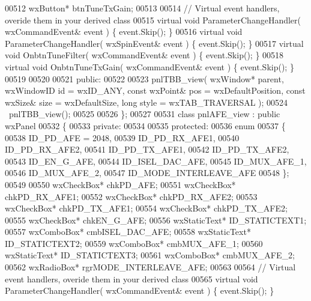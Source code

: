 \begin{DoxyCode}
00512         wxButton* btnTuneTxGain;
00513         
00514         \textcolor{comment}{// Virtual event handlers, overide them in your derived class}
00515         \textcolor{keyword}{virtual} \textcolor{keywordtype}{void} ParameterChangeHandler( wxCommandEvent& event ) \{ \textcolor{keyword}{event}.Skip(); \}
00516         \textcolor{keyword}{virtual} \textcolor{keywordtype}{void} ParameterChangeHandler( wxSpinEvent& event ) \{ \textcolor{keyword}{event}.Skip(); \}
00517         \textcolor{keyword}{virtual} \textcolor{keywordtype}{void} OnbtnTuneFilter( wxCommandEvent& event ) \{ \textcolor{keyword}{event}.Skip(); \}
00518         \textcolor{keyword}{virtual} \textcolor{keywordtype}{void} OnbtnTuneTxGain( wxCommandEvent& event ) \{ \textcolor{keyword}{event}.Skip(); \}
00519         
00520     
00521     \textcolor{keyword}{public}:
00522         
00523         pnlTBB_view( wxWindow* parent, wxWindowID \textcolor{keywordtype}{id} = wxID\_ANY, \textcolor{keyword}{const} wxPoint& pos = wxDefaultPosition, \textcolor{keyword}{
      const} wxSize& size = wxDefaultSize, \textcolor{keywordtype}{long} style = wxTAB\_TRAVERSAL ); 
00524         ~pnlTBB_view();
00525     
00526 \};
00527 
00531 \textcolor{keyword}{class }pnlAFE_view : \textcolor{keyword}{public} wxPanel 
00532 \{
00533     \textcolor{keyword}{private}:
00534     
00535     \textcolor{keyword}{protected}:
00536         \textcolor{keyword}{enum}
00537         \{
00538             ID\_PD\_AFE = 2048,
00539             ID_PD_RX_AFE1,
00540             ID_PD_RX_AFE2,
00541             ID_PD_TX_AFE1,
00542             ID_PD_TX_AFE2,
00543             ID_EN_G_AFE,
00544             ID_ISEL_DAC_AFE,
00545             ID_MUX_AFE_1,
00546             ID_MUX_AFE_2,
00547             ID\_MODE\_INTERLEAVE\_AFE
00548         \};
00549         
00550         wxCheckBox* chkPD_AFE;
00551         wxCheckBox* chkPD_RX_AFE1;
00552         wxCheckBox* chkPD_RX_AFE2;
00553         wxCheckBox* chkPD_TX_AFE1;
00554         wxCheckBox* chkPD_TX_AFE2;
00555         wxCheckBox* chkEN_G_AFE;
00556         wxStaticText* ID_STATICTEXT1;
00557         wxComboBox* cmbISEL_DAC_AFE;
00558         wxStaticText* ID_STATICTEXT2;
00559         wxComboBox* cmbMUX_AFE_1;
00560         wxStaticText* ID_STATICTEXT3;
00561         wxComboBox* cmbMUX_AFE_2;
00562         wxRadioBox* rgrMODE_INTERLEAVE_AFE;
00563         
00564         \textcolor{comment}{// Virtual event handlers, overide them in your derived class}
00565         \textcolor{keyword}{virtual} \textcolor{keywordtype}{void} ParameterChangeHandler( wxCommandEvent& event ) \{ \textcolor{keyword}{event}.Skip(); \}

\end{DoxyCode}
